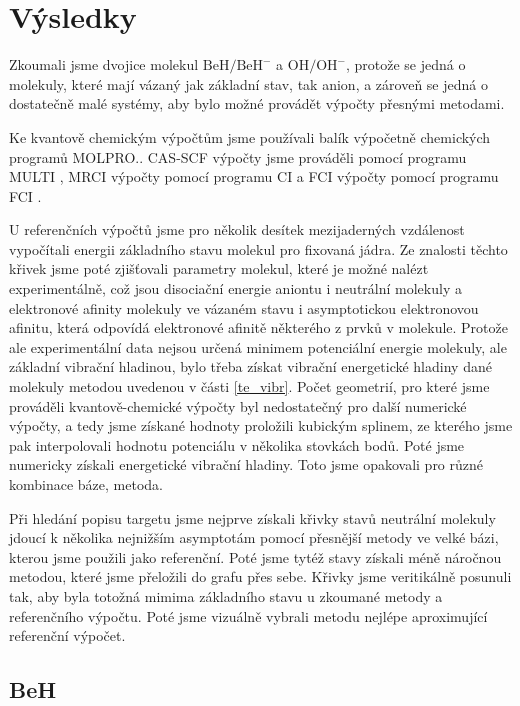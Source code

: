 \chapter{Výsledky}
Zkoumali jsme dvojice molekul $\mathrm{BeH/BeH^-}$ a $\mathrm{OH/OH^-}$, protože se jedná o 
molekuly, které mají vázaný jak základní stav, tak anion, a zároveň se jedná o 
dostatečně malé systémy, aby bylo možné provádět výpočty přesnými metodami.

Ke kvantově chemickým výpočtům jsme používali balík výpočetně chemických programů 
MOLPRO.\cite{MOLPRO-WIREs, MOLPRO}.
CAS-SCF výpočty jsme prováděli pomocí programu MULTI \cite{WK85,KW85}, MRCI výpočty 
pomocí programu CI \cite{KW92} a FCI výpočty pomocí programu FCI \cite{KH84,KH89}.

U referenčních výpočtů jsme pro několik desítek mezijaderných vzdálenost vypočítali 
energii základního stavu molekul pro fixovaná jádra. Ze znalosti těchto křivek jsme 
poté zjišťovali parametry molekul, které je 
možné nalézt experimentálně, což jsou disociační energie aniontu i neutrální molekuly 
a 
elektronové afinity molekuly  ve vázaném stavu i asymptotickou elektronovou afinitu, 
která odpovídá 
elektronové afinitě některého z prvků v molekule.  Protože ale experimentální 
data nejsou určená minimem potenciální energie molekuly, ale základní vibrační 
hladinou, bylo třeba získat vibrační energetické hladiny dané molekuly metodou uvedenou 
v části \ref{te_vibr}. Počet geometrií, pro které jsme 
prováděli kvantově-chemické výpočty byl nedostatečný pro další numerické výpočty, a 
tedy jsme získané hodnoty proložili kubickým splinem, ze kterého jsme pak 
interpolovali hodnotu potenciálu v několika stovkách bodů. Poté jsme numericky získali 
energetické vibrační hladiny. Toto jsme opakovali pro různé kombinace báze, metoda.

Při hledání popisu targetu jsme nejprve získali křivky stavů neutrální molekuly jdoucí 
k několika nejnižším asymptotám pomocí přesnější metody ve velké bázi, kterou jsme 
použili jako referenční. Poté jsme tytéž stavy získali méně náročnou metodou, které 
jsme přeložili do grafu přes sebe. Křivky jsme veritikálně posunuli tak, aby byla 
totožná mimima základního stavu u zkoumané metody a referenčního výpočtu. Poté jsme 
vizuálně vybrali metodu nejlépe aproximující referenční výpočet.

\section{BeH}


